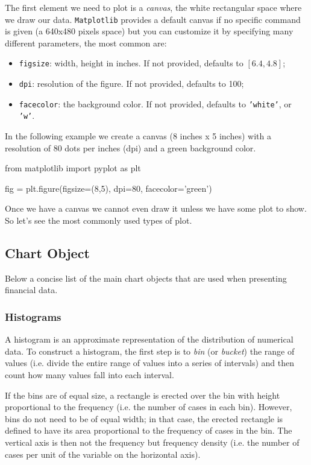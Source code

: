 The first element we need to plot is a \emph{canvas}, the white rectangular space where we draw our data. \texttt{Matplotlib} provides a default canvas if no specific command is given (a 640x480 pixels space) but you can customize it by specifying many different parameters, the most common are:

\begin{itemize}
\tightlist
\item \texttt{figsize}: width, height in inches. If not provided, defaults to \([6.4, 4.8]\);
\item \texttt{dpi}: resolution of the figure. If not provided, defaults to 100;
\item \texttt{facecolor}: the background color. If not provided, defaults to \texttt{'white'}, or \texttt{'w'}.
\end{itemize}

In the following example we create a canvas (8 inches x 5 inches) with a resolution of 80 dots per inches (dpi) and a green background color.

\begin{ipython}
from matplotlib import pyplot as plt

fig = plt.figure(figsize=(8,5), dpi=80, facecolor='green')
\end{ipython}

Once we have a canvas we cannot even draw it unless we have some plot to show. So let's see the most commonly used types of plot.

\subsection{Chart Object}\label{chart-object}

Below a concise list of the main chart objects that are used when presenting financial data.

\subsubsection{Histograms}\label{histograms}

A histogram is an approximate representation of the distribution of numerical data. To construct a histogram, the first step is to \emph{bin} (or \emph{bucket}) the range of values (i.e. divide the entire range of values into a series of intervals) and then count how many values fall into each interval.

If the bins are of equal size, a rectangle is erected over the bin with height proportional to the frequency (i.e. the number of cases in each bin).
However, bins do not need to be of equal width; in that case, the erected rectangle is defined to have its area proportional to the frequency of cases in the bin. 
The vertical axis is then not the frequency but frequency density (i.e. the number of cases per unit of the variable on the horizontal axis).

